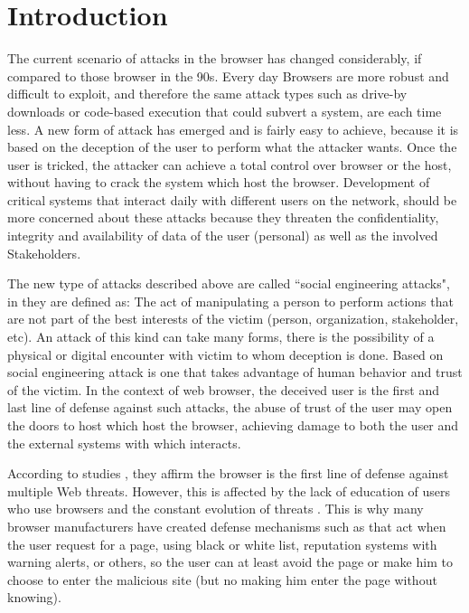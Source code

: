 \documentclass{sig-alternate-05-2015}
\begin{document}





\section{Introduction}
The current scenario of attacks in the browser has changed considerably, if compared to those browser in the 90s. Every day Browsers are more robust and difficult to exploit, and therefore the same attack types such as drive-by downloads or code-based execution that could subvert a system, are each time less. A new form of attack has emerged and is fairly easy to achieve, because it is based on the deception of the user to perform what the attacker wants. Once the user is tricked, the attacker can achieve a total control over browser or the host, without having to crack the system \cite{Rajab2013,Labs2013} which host the browser. Development of critical systems that interact daily with different users on the network, should be more concerned about these attacks because they threaten the confidentiality, integrity and availability of data of the user (personal) as well as the involved Stakeholders.

The new type of attacks described above are called ``social engineering attacks", in \cite{socEngineeering} they are defined as: The act of manipulating a person to perform actions that are not part of the best interests of the victim (person, organization, stakeholder, etc). An attack of this kind can take many forms, there is the possibility of a physical or digital encounter with victim to whom deception is done. Based on social engineering attack is one that takes advantage of human behavior and trust of the victim. In the context of web browser, the deceived user is the first and last line of defense against such attacks, the abuse of trust of the user may open the doors to host which host the browser, achieving damage to both the user and the external systems with which interacts.

According to studies \cite{browSecPhish,Labs2013,rowSecSEMBlock}, they affirm the browser is the first line of defense against multiple Web threats. However, this is affected by the lack of education of users who use browsers and the constant evolution of threats \cite{browSecPhish}. This is why many browser manufacturers have created defense mechanisms such as \cite{Drake2011} that act when the user request for a page, using black or white list, reputation systems \cite{Rajab2013} with warning alerts, or others, so the user can at least avoid the page or make him to choose to enter the malicious site (but no making him enter the page without knowing).
\end{document}
